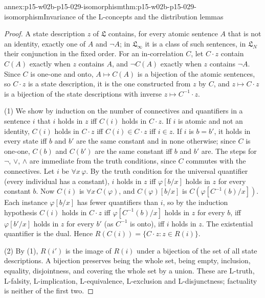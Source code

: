 \begin{annexitem}{annex:p15-w02b-p15-029-isomorphism}{thm:p15-w02b-p15-029-isomorphism}{Invariance of the L-concepts and the distribution lemmas}
\begin{proof}
A state description \(z\) of \(\mathfrak L\) contains, for every atomic
sentence \(A\) that is not an identity, exactly one of \(A\) and
\(\neg A\); in \(\mathfrak L_\infty\) it is a class of such sentences,
in \(\mathfrak L_N\) their conjunction in the fixed order. For an
in-correlation \(C\), let \(C\cdot z\) contain \(C(A)\) exactly when
\(z\) contains \(A\), and \(\neg C(A)\) exactly when \(z\) contains
\(\neg A\). Since \(C\) is one-one and onto, \(A\mapsto C(A)\) is a
bijection of the atomic sentences, so \(C\cdot z\) is a state
description, it is the one constructed from \(z\) by \(C\), and
\(z\mapsto C\cdot z\) is a bijection of the state descriptions with
inverse \(z\mapsto C^{-1}\cdot z\).

(1) We show by induction on the number of connectives and quantifiers
in a sentence \(i\) that \(i\) holds in \(z\) iff \(C(i)\) holds in
\(C\cdot z\). If \(i\) is atomic and not an identity, \(C(i)\) holds in
\(C\cdot z\) iff \(C(i)\in C\cdot z\) iff \(i\in z\). If \(i\) is
\(b=b'\), it holds in every state iff \(b\) and \(b'\) are the same
constant and in none otherwise; since \(C\) is one-one, \(C(b)\) and
\(C(b')\) are the same constant iff \(b\) and \(b'\) are. The steps for
\(\neg\), \(\lor\), \(\land\) are immediate from the truth conditions,
since \(C\) commutes with the connectives. Let \(i\) be \(\forall x\,\varphi\).
By the truth condition for the universal quantifier (every individual
has a constant), \(i\) holds in \(z\) iff \(\varphi[b/x]\) holds in
\(z\) for every constant \(b\). Now \(C(i)\) is \(\forall x\,C(\varphi)\),
and \(C(\varphi)[b/x]\) is \(C(\varphi[C^{-1}(b)/x])\). Each instance
\(\varphi[b/x]\) has fewer quantifiers than \(i\), so by the induction
hypothesis \(C(i)\) holds in \(C\cdot z\) iff \(\varphi[C^{-1}(b)/x]\)
holds in \(z\) for every \(b\), iff \(\varphi[b'/x]\) holds in \(z\) for
every \(b'\) (as \(C^{-1}\) is onto), iff \(i\) holds in \(z\). The
existential quantifier is the dual. Hence
\(R(C(i))=\{C\cdot z:z\in R(i)\}\).

(2) By (1), \(R(i')\) is the image of \(R(i)\) under a bijection of the
set of all state descriptions. A bijection preserves being the whole
set, being empty, inclusion, equality, disjointness, and covering the
whole set by a union. These are L-truth, L-falsity, L-implication,
L-equivalence, L-exclusion and L-disjunctness; factuality is neither
of the first two.


\end{proof}
\end{annexitem}
